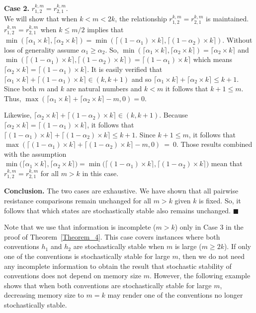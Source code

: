 \documentclass[11.5pt]{article}
\begin{document}
{\bf Case 2.} $r^{k,m}_{1,2} = r^{k,m}_{2,1}$.\\
We will show that when $k < m < 2k$, the relationship $r^{k,m}_{1,2} = r^{k,m}_{2,1}$ is maintained. $r^{k,m}_{1,2} = r^{k,m}_{2,1}$ when $k \leq m/2$ implies that $\min(\lceil \alpha_1 \times k \rceil,\lceil \alpha_2 \times k \rceil) = \min(\lceil (1-\alpha_1) \times k \rceil,\lceil (1-\alpha_2) \times k \rceil)$. Without loss of generality assume $\alpha_1\geq \alpha_2$. So, $\min(\lceil \alpha_1 \times k \rceil,\lceil \alpha_2 \times k \rceil) = \lceil \alpha_2 \times k \rceil$ and $\min(\lceil (1-\alpha_1) \times k \rceil,\lceil (1-\alpha_2) \times k \rceil) = \lceil (1-\alpha_1) \times k \rceil$ which means $\lceil \alpha_2 \times k \rceil = \lceil (1-\alpha_1) \times k \rceil$. It is easily verified that $\lceil \alpha_1 \times k \rceil+\lceil (1-\alpha_1) \times k \rceil \in (k, k+1)$ and so $\lceil \alpha_1 \times k \rceil+\lceil \alpha_2 \times k \rceil \leq k+1$. Since both $m$ and $k$ are natural numbers and $k<m$ it follows that $k+1 \leq m$. Thus, $\max(\lceil \alpha_1 \times k \rceil+\lceil \alpha_2 \times k \rceil-m,0) = 0$.

Likewise, $\lceil \alpha_2 \times k \rceil+\lceil (1-\alpha_2) \times k \rceil \in (k, k+1)$. Because $\lceil \alpha_2 \times k \rceil = \lceil (1-\alpha_1) \times k \rceil$, it follows that $\lceil (1-\alpha_1) \times k \rceil+\lceil (1-\alpha_2) \times k \rceil \leq k+1$. Since $k+1 \leq m$, it follows that $\max(\lceil (1-\alpha_1) \times k \rceil+\lceil (1-\alpha_2) \times k \rceil-m,0)~=~0$.
Those results combined with the assumption $\min\big(\lceil \alpha_1 \times k \rceil,\lceil \alpha_2 \times k \rceil\big) = \min\big(\lceil (1-\alpha_1) \times k \rceil,\lceil (1-\alpha_2) \times k \rceil\big)$ mean that $r^{k,m}_{1,2} = r^{k,m}_{2,1}$ for all $m > k$ in this case.

{\bf Conclusion.} The two cases are exhaustive. We have shown that all pairwise resistance comparisons remain unchanged for all $m > k$ given $k$ is fixed. So, it follows that which states are stochastically stable also remains unchanged.
$\blacksquare$

Note that we use that information is incomplete ($m>k$) only in Case 3 in the proof of Theorem~\ref{Theorem_4}. This case covers instances where both conventions $h_1$ and $h_2$ are stochastically stable when $m$ is large ($m\geq 2k$). If only one of the conventions is stochastically stable for large $m$, then we do not need any incomplete information to obtain the result that stochastic stability of conventions does not depend on memory size $m$. However, the following example shows that when both conventions are stochastically stable for large $m$, decreasing memory size to $m=k$ may render one of the conventions no longer stochastically stable.
\end{document}

